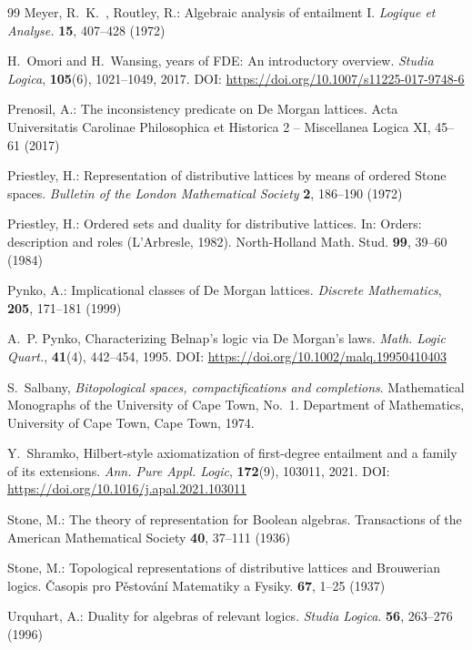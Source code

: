 \documentclass{amsart}
\theoremstyle{plain}
\theoremstyle{definition}
\begin{document}
\begin{thebibliography}{99}
 Meyer, R.~K.~, Routley, R.: Algebraic analysis of entailment I. \emph{Logique
et Analyse.} \textbf{15}, 407--428 (1972) 

H.~Omori and H.~Wansing,
 years of {FDE}: An introductory overview.
\newblock \emph{Studia Logica}, \textbf{105}(6), 1021--1049, 2017.
\newblock DOI: \url{https://doi.org/10.1007/s11225-017-9748-6}

 Prenosil, A.: The inconsistency predicate on De Morgan lattices. Acta Universitatis Carolinae Philosophica et Historica 2 – Miscellanea Logica XI, 45--61 (2017) 

Priestley, H.: Representation of distributive lattices by means of ordered Stone spaces. \emph{Bulletin of the London Mathematical Society} \textbf{2}, 186--190 (1972) 

 Priestley, H.: Ordered sets and duality for distributive lattices. In: Orders: description and
roles (L’Arbresle, 1982). North-Holland Math. Stud. \textbf{99}, 39--60 (1984)

 Pynko, A.: Implicational classes of De Morgan lattices. \emph{Discrete Mathematics}, \textbf{205}, 171--181 (1999)

A.~P. Pynko, 
\newblock Characterizing {B}elnap's logic via {D}e {M}organ's laws.
\newblock \emph{Math. Logic Quart.}, \textbf{41}(4), 442--454, 1995.
\newblock DOI: \url{https://doi.org/10.1002/malq.19950410403}

S.~Salbany,
\newblock \emph{Bitopological spaces, compactifications and completions}.
\newblock Mathematical Monographs of the University of Cape Town, No.~1. Department of Mathematics, University of Cape Town, Cape Town, 1974.



Y.~Shramko,
\newblock Hilbert-style axiomatization of first-degree entailment and a family of its extensions.
\newblock \emph{Ann. Pure Appl. Logic}, \textbf{172}(9), 103011, 2021.
\newblock DOI: \url{https://doi.org/10.1016/j.apal.2021.103011}


Stone, M.: The theory of representation for Boolean algebras. Transactions of the American Mathematical Society \textbf{40}, 37--111 (1936) 


Stone, M.: Topological representations of distributive lattices and Brouwerian logics. \v{C}asopis pro P\v{e}stov\'an\'i Matematiky a Fysiky. \textbf{67}, 1--25 (1937) 

 Urquhart, A.: Duality for algebras of relevant logics. \emph{Studia Logica}. \textbf{56}, 263--276 (1996) 



\end{thebibliography}
\end{document}

